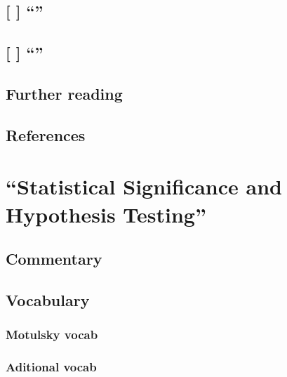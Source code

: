 \documentclass[]{book}
\theoremstyle{definition}
\theoremstyle{definition}
\theoremstyle{definition}
\theoremstyle{remark}
\begin{document}
\section{\texorpdfstring{{[} {]} ``''}{{[} {]} }}\label{section-22}

\section{\texorpdfstring{{[} {]} ``''}{{[} {]} }}\label{section-23}

\section*{Further reading}\label{further-reading-13}

\section*{References}\label{references-13}

\chapter{\texorpdfstring{``Statistical Significance and Hypothesis
Testing''}{Statistical Significance and Hypothesis Testing}}\label{ch16}

\section*{Commentary}\label{commentary-14}

\section*{Vocabulary}\label{vocabulary-15}

\subsection*{Motulsky vocab}\label{motulsky-vocab-15}

\subsection*{Aditional vocab}\label{aditional-vocab-12}
\end{document}
